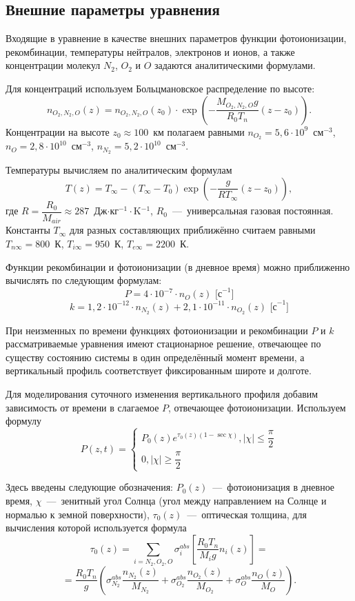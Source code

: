 \documentclass[14pt, a4paper, fleqn]{extarticle}
\renewcommand{\leq}{\leqslant}
\renewcommand{\geq}{\geqslant}
\begin{document}
\subsection{Внешние параметры уравнения}

Входящие в уравнение в качестве внешних параметров функции фотоионизации, рекомбинации, температуры нейтралов, электронов и ионов, а также концентрации молекул $N_2$, $O_2$ и $O$ задаются аналитическими формулами. 

Для концентраций используем Больцмановское распределение по высоте: $$n_{O_2, N_2, O} (z)= n_{O_2, N_2, O} (z_0)\cdot \exp\left(-\dfrac{M_{O_2, N_2, O}g}{R_0T_n}(z-z_0)\right).$$ Концентрации на высоте $z_0\approx 100$~км полагаем равными $n_{O_2} = 5{,}6\cdot 10^9$~см$^{-3}$, $n_{O} = 2{,}8\cdot 10^{10}$~см$^{-3}$, $n_{N_2} = 5{,}2\cdot 10^{10}$~см$^{-3}$. 

Температуры вычисляем по аналитическим формулам $$T(z)=T_\infty - (T_\infty-T_0)\exp\left(-\dfrac{g}{RT_\infty}(z-z_0)\right),$$ где $R=\dfrac{R_0}{M_{air}}\approx 287$~Дж$\cdot$кг$^{-1}\cdot$K$^{-1}$, $R_0$~---~универсальная газовая постоянная. Константы $T_\infty$ для разных составляющих приближённо считаем равными $T_{n\infty}=800$~К, $T_{i\infty}=950$~К, $T_{e\infty}=2200$~К.

Функции рекомбинации и фотоионизации (в дневное время) можно приближенно вычислять по следующим формулам: $$P=4\cdot10^{-7}\cdot n_O(z)\textrm{ [с}^{-1}\textrm{]}$$ $$k=1{,}2\cdot10^{-12}\cdot n_{N_2}(z)+2{,}1\cdot 10^{-11}\cdot n_{O_2}(z) \textrm{ [с}^{-1}\textrm{]}$$

При неизменных по времени функциях фотоионизации и рекомбинации $P$ и $k$ рассматриваемые уравнения имеют стационарное решение, отвечающее по существу состоянию системы в один определённый момент времени, а вертикальный профиль соответствует фиксированным широте и долготе. 

Для моделирования суточного изменения вертикального профиля добавим зависимость от времени в слагаемое $P$, отвечающее фотоионизации. Используем формулу $$P(z, t) =\begin{cases}
P_0(z)e^{\tau_0(z)(1-\sec\chi)}, |\chi|\leq\dfrac{\pi}{2}\\
0, |\chi|\geq\dfrac{\pi}{2}
\end{cases}$$

Здесь введены следующие обозначения: $P_0(z)$~---~фотоионизация в дневное время, $\chi$~---~зенитный угол Солнца (угол между направлением на Солнце и нормалью к земной поверхности), $\tau_0(z)$~---~оптическая толщина, для вычисления которой используется формула $$\tau_0(z)=\sum_{i = N_2, O_2, O} \sigma_i^{abs}\left[\dfrac{R_0T_n}{M_i g}n_i(z)\right]=$$ $$=\dfrac{R_0T_n}{g}\left(\sigma_{N_2}^{abs}\dfrac{n_{N_2}(z)}{M_{N_2}}+\sigma_{O_2}^{abs}\dfrac{n_{O_2}(z)}{M_{O_2}}+\sigma_{O}^{abs}\dfrac{n_{O}(z)}{M_{O}}\right).$$
\end{document}
